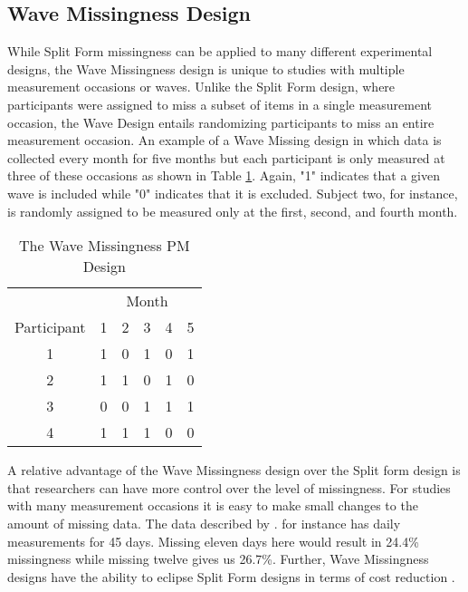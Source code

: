 \documentclass{svjour3}                     %
\begin{document}
\subsection{Wave Missingness Design}
\label{sec:1.2}
While Split Form missingness can be applied to many different experimental designs, the Wave Missingness design \citep{little2013planned} is unique to studies with multiple measurement occasions or waves. Unlike the Split Form design, where participants were assigned to miss a subset of items in a single measurement occasion, the Wave Design entails randomizing participants to miss an entire measurement occasion. An example of a Wave Missing design in which data is collected every month for five months but each participant is only measured at three of these occasions as shown in Table \ref{tab:table11}. Again, "1" indicates that a given wave is included while "0" indicates that it is excluded. Subject two, for instance, is randomly assigned to be measured only at the first, second, and fourth month. \par

\begin{table}[b!]
	\centering
	\caption{The Wave Missingness PM Design}
	\label{tab:table11}
	\setlength{\tabcolsep}{0.75cm}
	\begin{tabular}{c|ccccc}
		\toprule
		& \multicolumn{5}{c}{Month} \\
		Participant & 1 & 2 & 3 & 4 & 5 \\
		\midrule
		1 & 1 & 0 & 1 & 0 & 1 \\
		2 & 1 & 1 & 0 & 1 & 0 \\
		3 & 0 & 0 & 1 & 1 & 1 \\
		4 & 1 & 1 & 1 & 0 & 0 \\
		\bottomrule
	\end{tabular}
\end{table}


A relative advantage of the Wave Missingness design over the Split form design is that researchers can have more control over the level of missingness. For studies with many measurement occasions it is easy to make small changes to the amount of missing data. The data described by \citet{pellowski2016alcohol}. \citet{pellowski2016alcohol} for instance has daily measurements for 45 days. Missing eleven days here would result in 24.4\% missingness while missing twelve gives us 26.7\%. Further, Wave Missingness designs have the ability to eclipse Split Form designs in terms of cost reduction \citep{little2013planned}. \par
\end{document}

